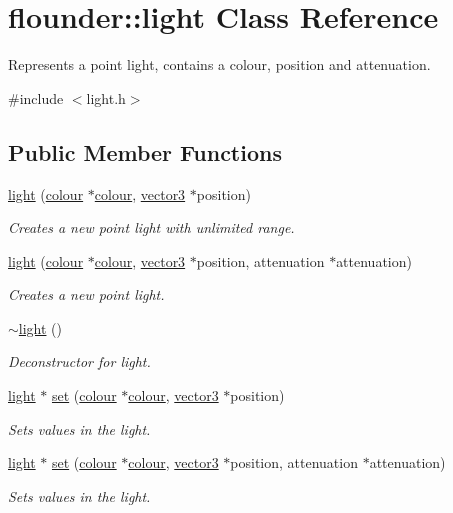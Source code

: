 \hypertarget{classflounder_1_1light}{}\section{flounder\+:\+:light Class Reference}
\label{classflounder_1_1light}


Represents a point light, contains a colour, position and attenuation.  




{\ttfamily \#include $<$light.\+h$>$}

\subsection*{Public Member Functions}
\begin{DoxyCompactItemize}
\item 
\hyperlink{classflounder_1_1light_a14ba36b32493ab4e40800f7146d90f00}{light} (\hyperlink{classflounder_1_1colour}{colour} $\ast$\hyperlink{classflounder_1_1colour}{colour}, \hyperlink{classflounder_1_1vector3}{vector3} $\ast$position)
\begin{DoxyCompactList}\small\item\em Creates a new point light with unlimited range. \end{DoxyCompactList}\item 
\hyperlink{classflounder_1_1light_a709ddf76cdafd5b95ff5f032a17eb76f}{light} (\hyperlink{classflounder_1_1colour}{colour} $\ast$\hyperlink{classflounder_1_1colour}{colour}, \hyperlink{classflounder_1_1vector3}{vector3} $\ast$position, attenuation $\ast$attenuation)
\begin{DoxyCompactList}\small\item\em Creates a new point light. \end{DoxyCompactList}\item 
\hyperlink{classflounder_1_1light_a352cc02167e091a1c05d560d96ca3636}{$\sim$light} ()
\begin{DoxyCompactList}\small\item\em Deconstructor for light. \end{DoxyCompactList}\item 
\hyperlink{classflounder_1_1light}{light} $\ast$ \hyperlink{classflounder_1_1light_ac01c16e7d4436d43205a33aa9662813a}{set} (\hyperlink{classflounder_1_1colour}{colour} $\ast$\hyperlink{classflounder_1_1colour}{colour}, \hyperlink{classflounder_1_1vector3}{vector3} $\ast$position)
\begin{DoxyCompactList}\small\item\em Sets values in the light. \end{DoxyCompactList}\item 
\hyperlink{classflounder_1_1light}{light} $\ast$ \hyperlink{classflounder_1_1light_aa5f447bd799982f1d8012b09b25fd6ec}{set} (\hyperlink{classflounder_1_1colour}{colour} $\ast$\hyperlink{classflounder_1_1colour}{colour}, \hyperlink{classflounder_1_1vector3}{vector3} $\ast$position, attenuation $\ast$attenuation)
\begin{DoxyCompactList}\small\item\em Sets values in the light. \end{DoxyCompactList}\end{DoxyCompactItemize}

